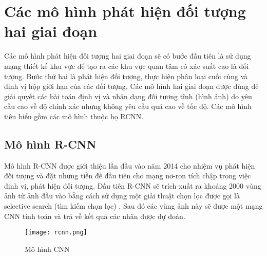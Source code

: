 \documentclass[../the.tex]{subfiles}
\begin{document}
\section{Các mô hình phát hiện đối tượng hai giai đoạn }
{\fontsize{13}{12} \selectfont 	 
Các mô hình phát hiện đối tượng hai giai đoạn sẽ có bước đầu tiên là sử dụng mạng thiết kế khu vực để tạo ra các khu vực quan tâm có xác suất cao là đối tượng. 
Bước thứ hai là phát hiện đối tượng, thực hiện phân loại cuối cùng và định vị hộp giới hạn của các đối tượng.
Các mô hình hai giai đoạn được dùng để giải quyết các bài toán định vị và nhận dạng đối tượng tĩnh (hình ảnh) do yêu cầu cao về độ chính xác nhưng không yêu cầu quá cao về tốc độ.
Các mô hình tiêu biểu gồm các mô hình thuộc họ RCNN.
}
\subsection{Mô hình R-CNN}
{\fontsize{13}{12} \selectfont
Mô hình R-CNN được giới thiệu lần đầu vào năm 2014 \cite{girshick2014rich} cho nhiệm vụ phát hiện đối tượng và đặt những tiền đề đầu tiên cho mạng nơ-ron tích chập
trong việc định vị, phát hiện đối tượng. Đầu tiên R-CNN sẽ trích xuất ra khoảng 2000 vùng ảnh từ ảnh đầu vào bằng cách sử dụng một giải thuật chọn lọc được gọi là selective search (tìm kiếm chọn lọc) \cite{uijlings2013selective}.
Sau đó các vùng ảnh này sẽ được một mạng CNN tính toán và trả về kết quả các nhãn được dự đoán.
}
\begin{figure}[H]
	\centering
	\texttt{[image: rcnn.png]}
	\caption{Mô hình CNN \cite{girshick2014rich}}
	\label{fig:rcnn}
\end{figure}
\end{document}
